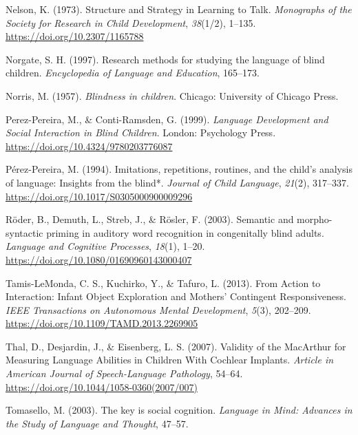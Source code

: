 \documentclass[
  man,floatsintext]{apa6}
\newlength{\cslhangindent}
\newlength{\cslentryspacingunit} %
\newenvironment{CSLReferences}[2] %
 {%
  \setlength{\parindent}{0pt}
  \ifodd #1
  \let\oldpar\par
  \def\par{\hangindent=\cslhangindent\oldpar}
  \fi
  \setlength{\parskip}{#2\cslentryspacingunit}
 }%
 {}
\begin{document}
\begin{CSLReferences}{1}{0}
\leavevmode{}%
Nelson, K. (1973). Structure and {Strategy} in {Learning} to {Talk}. \emph{Monographs of the Society for Research in Child Development}, \emph{38}(1/2), 1--135. \url{https://doi.org/10.2307/1165788}

\leavevmode{}%
Norgate, S. H. (1997). Research methods for studying the language of blind children. \emph{Encyclopedia of Language and Education}, 165--173.

\leavevmode{}%
Norris, M. (1957). \emph{Blindness in children}. {Chicago}: {University of Chicago Press}.

\leavevmode{}%
Perez-Pereira, M., \& Conti-Ramsden, G. (1999). \emph{Language {Development} and {Social Interaction} in {Blind Children}}. {London}: {Psychology Press}. \url{https://doi.org/10.4324/9780203776087}

\leavevmode{}%
Pérez-Pereira, M. (1994). Imitations, repetitions, routines, and the child's analysis of language: Insights from the blind*. \emph{Journal of Child Language}, \emph{21}(2), 317--337. \url{https://doi.org/10.1017/S0305000900009296}

\leavevmode{}%
Röder, B., Demuth, L., Streb, J., \& Rösler, F. (2003). Semantic and morpho-syntactic priming in auditory word recognition in congenitally blind adults. \emph{Language and Cognitive Processes}, \emph{18}(1), 1--20. \url{https://doi.org/10.1080/01690960143000407}

\leavevmode{}%
Tamis-LeMonda, C. S., Kuchirko, Y., \& Tafuro, L. (2013). From {Action} to {Interaction}: {Infant Object Exploration} and {Mothers}' {Contingent Responsiveness}. \emph{IEEE Transactions on Autonomous Mental Development}, \emph{5}(3), 202--209. \url{https://doi.org/10.1109/TAMD.2013.2269905}

\leavevmode{}%
Thal, D., Desjardin, J., \& Eisenberg, L. S. (2007). Validity of the {MacArthur} for {Measuring Language Abilities} in {Children With Cochlear Implants}. \emph{Article in American Journal of Speech-Language Pathology}, 54--64. \url{https://doi.org/10.1044/1058-0360(2007/007)}

\leavevmode{}%
Tomasello, M. (2003). The key is social cognition. \emph{Language in Mind: Advances in the Study of Language and Thought}, 47--57.


\end{CSLReferences}
\end{document}
